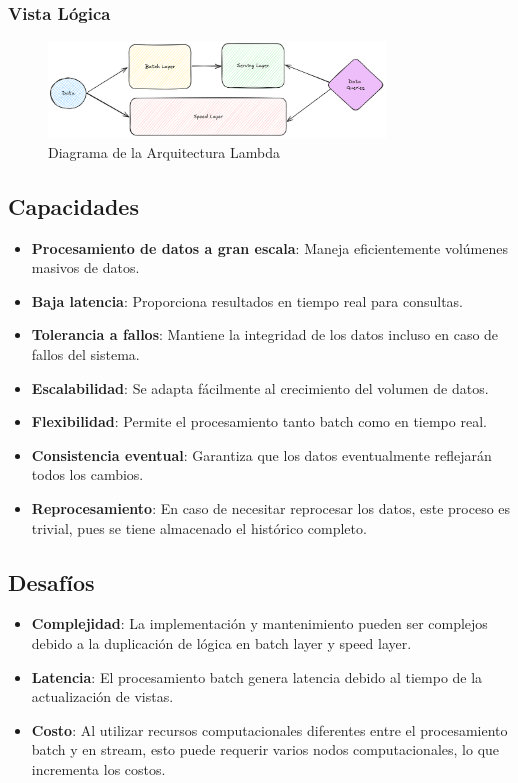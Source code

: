 \newpage
\subsubsection{Vista Lógica}
\begin{figure}[h]
\centering
\includegraphics[width=0.8\textwidth]{teorico/arquitecturas/lambda.png}
\caption{Diagrama de la Arquitectura Lambda}
\label{fig:arquitectura_lambda}
\end{figure}
\clearpage
\newpage

\subsection{Capacidades}
\begin{itemize}
\item \textbf{Procesamiento de datos a gran escala}: Maneja eficientemente volúmenes masivos de datos.
\item \textbf{Baja latencia}: Proporciona resultados en tiempo real para consultas.
\item \textbf{Tolerancia a fallos}: Mantiene la integridad de los datos incluso en caso de fallos del sistema.
\item \textbf{Escalabilidad}: Se adapta fácilmente al crecimiento del volumen de datos.
\item \textbf{Flexibilidad}: Permite el procesamiento tanto batch como en tiempo real.
\item \textbf{Consistencia eventual}: Garantiza que los datos eventualmente reflejarán todos los cambios.
\item \textbf{Reprocesamiento}: En caso de necesitar reprocesar los datos, este proceso es trivial, pues se tiene almacenado el histórico completo.
\end{itemize}

\subsection{Desafíos}
\begin{itemize}
\item \textbf{Complejidad}: La implementación y mantenimiento pueden ser complejos debido a la duplicación de lógica en batch layer y speed layer.
\item \textbf{Latencia}: El procesamiento batch genera latencia debido al tiempo de la actualización de vistas.
\item \textbf{Costo}: Al utilizar recursos computacionales diferentes entre el procesamiento batch y en stream, esto puede requerir varios nodos computacionales, lo que incrementa los costos.
\end{itemize}
\newpage
